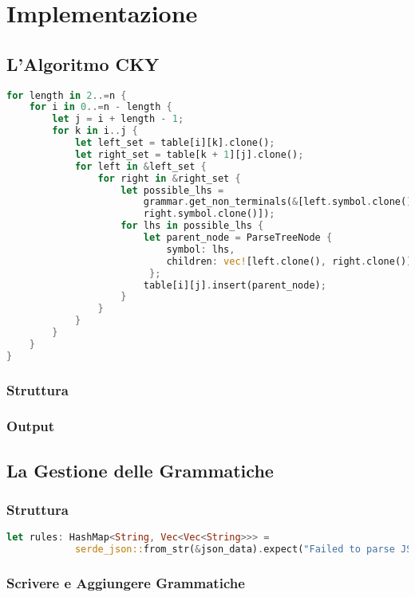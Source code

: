 \chapter{Implementazione}

\section{L'Algoritmo CKY}

\begin{lstlisting}[language=rust, caption = Algoritmo CKY]
for length in 2..=n {
    for i in 0..=n - length {
        let j = i + length - 1;
        for k in i..j {
            let left_set = table[i][k].clone();
            let right_set = table[k + 1][j].clone();
            for left in &left_set {
                for right in &right_set {
                    let possible_lhs =
                        grammar.get_non_terminals(&[left.symbol.clone(), 
                        right.symbol.clone()]);
                    for lhs in possible_lhs {
                        let parent_node = ParseTreeNode {
                            symbol: lhs,
                            children: vec![left.clone(), right.clone()],
                         };
                        table[i][j].insert(parent_node);
                    }
                }
            }
        }
    }
}


\end{lstlisting}

\subsection{Struttura}

\subsection{Output}

\section{La Gestione delle Grammatiche}

\subsection{Struttura}

\begin{lstlisting}[language=rust, caption = Creazione delle regole per la grammatica]    
let rules: HashMap<String, Vec<Vec<String>>> =
            serde_json::from_str(&json_data).expect("Failed to parse JSON");
\end{lstlisting}

\subsection{Scrivere e Aggiungere Grammatiche}
